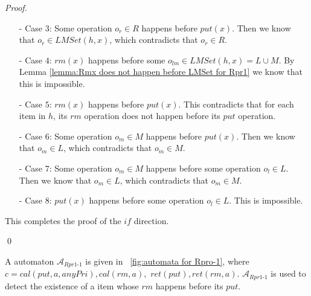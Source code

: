 \begin {proof}
\begin{itemize}
\item[-] Case $3$: Some operation $o_r \in R$ happens before $\textit{put}(x)$. Then we know that $o_r \in \textit{LMSet}(h,x)$, which contradicts that $o_r \in R$.

\item[-] Case $4$: $\textit{rm}(x)$ happens before some $o_{lm} \in \textit{LMSet}(h,x) = L \cup M$. By Lemma \ref{lemma:Rmx does not happen before LMSet for Rpr1} we know that this is impossible.

\item[-] Case $5$: $\textit{rm}(x)$ happens before $\textit{put}(x)$. This contradicts that for each item in $h$, its $\textit{rm}$ operation does not happen before its $\textit{put}$ operation.

\item[-] Case $6$: Some operation $o_m \in M$ happens before $\textit{put}(x)$. Then we know that $o_m \in L$, which contradicts that $o_m \in M$.

\item[-] Case $7$: Some operation $o_m \in M$ happens before some operation $o_l \in L$. Then we know that $o_m \in L$, which contradicts that $o_m \in M$.

\item[-] Case $8$: $\textit{put}(x)$ happens before some operation $o_l \in L$. This is impossible.
\end{itemize}

This completes the proof of the $\textit{if}$ direction.

\qed
\end {proof}



A automaton $\mathcal{A}_{\textit{Rpr1-1}}$ is given in \figurename~\ref{fig:automata for Rpro-1}, where $c=\textit{cal}(\textit{put},a,\textit{anyPri}),\textit{cal}(rm,a),$ $\textit{ret}(\textit{put}),\textit{ret}(\textit{rm},a)$. $\mathcal{A}_{\textit{Rpr1-1}}$ is used to detect the existence of a item whose $\textit{rm}$ happens before its $\textit{put}$.

